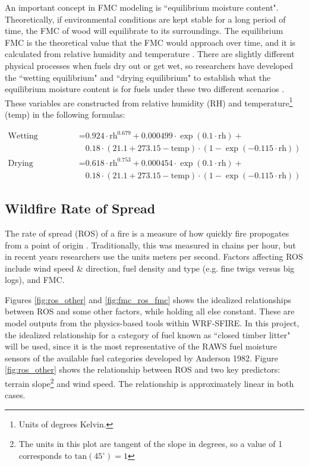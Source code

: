 \documentclass[11pt]{article}%
\begin{document}
An important concept in FMC modeling is ``equilibrium moisture content". Theoretically, if environmental conditions are kept stable for a long period of time, the FMC of wood will equilibrate to its surroundings. The equilibrium FMC is the theoretical value that the FMC would approach over time, and it is calculated from relative humidity and temperature \cite{Mitchell-2018-CEM}. There are slightly different physical processes when fuels dry out or get wet, so researchers have developed the ``wetting equilibrium" and ``drying equilibrium" to establish what the equilibrium moisture content is for fuels under these two different scenarios \cite{Mandel-2014-RAA}. These variables are constructed from relative humidity (RH) and temperature\footnote{Units of degrees Kelvin.} (temp) in the following formulas:



\begin{equation}
\label{eq:equil}
\begin{split}
\text{Wetting Equilibrium} = &0.924\cdot\text{rh}^{0.679} + 0.000499\cdot\exp(0.1\cdot\text{rh}) + \\ &0.18\cdot(21.1 + 273.15 - \text{temp})\cdot(1 - \exp(-0.115\cdot\text{rh})) \\
\text{Drying Equilibrium} = &0.618\cdot\text{rh}^{0.753} + 0.000454\cdot\exp(0.1\cdot\text{rh}) + \\ &0.18\cdot(21.1 + 273.15 - \text{temp})\cdot(1 - \exp(-0.115\cdot\text{rh}))
\end{split}
\end{equation}

\subsection{Wildfire Rate of Spread}

The rate of spread (ROS) of a fire is a measure of how quickly fire propogates from a point of origin \cite{NFSC-2024-MFB}. Traditionally, this was measured in chains per hour, but in recent years researchers use the units meters per second. Factors affecting ROS include wind speed \& direction, fuel density and type (e.g. fine twigs versus big logs), and FMC. 

Figures \ref{fig:ros_other} and \ref{fig:fmc_ros_fmc} shows the idealized relationships between ROS and some other factors, while holding all else constant. These are model outputs from the physics-based tools within WRF-SFIRE. In this project, the idealized relationship for a category of fuel known as ``closed timber litter" will be used, since it is the most representative of the RAWS fuel moisture sensors of the available fuel categories developed by Anderson 1982. \cite{NIFC-2024-FAF} Figure \ref{fig:ros_other} shows the relationship between ROS and two key predictors: terrain slope\footnote{The units in this plot are tangent of the slope in degrees, so a value of 1 corresponds to $\text{tan} (45^\circ) = 1$} and wind speed. \cite{OpenWFM-2024-HTD} The relationship is approximately linear in both cases.
\end{document}
